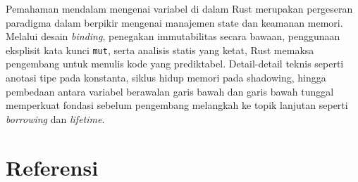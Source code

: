 \documentclass[11pt,a4paper]{article}
\begin{document}
Pemahaman mendalam mengenai variabel di dalam Rust merupakan pergeseran paradigma dalam berpikir mengenai manajemen state dan keamanan memori. Melalui desain \textit{binding}, penegakan immutabilitas secara bawaan, penggunaan eksplisit kata kunci \texttt{mut}, serta analisis statis yang ketat, Rust memaksa pengembang untuk menulis kode yang prediktabel. Detail-detail teknis seperti anotasi tipe pada konstanta, siklus hidup memori pada shadowing, hingga pembedaan antara variabel berawalan garis bawah dan garis bawah tunggal memperkuat fondasi sebelum pengembang melangkah ke topik lanjutan seperti \textit{borrowing} dan \textit{lifetime}.

\newpage
\section*{Referensi}
\end{document}
